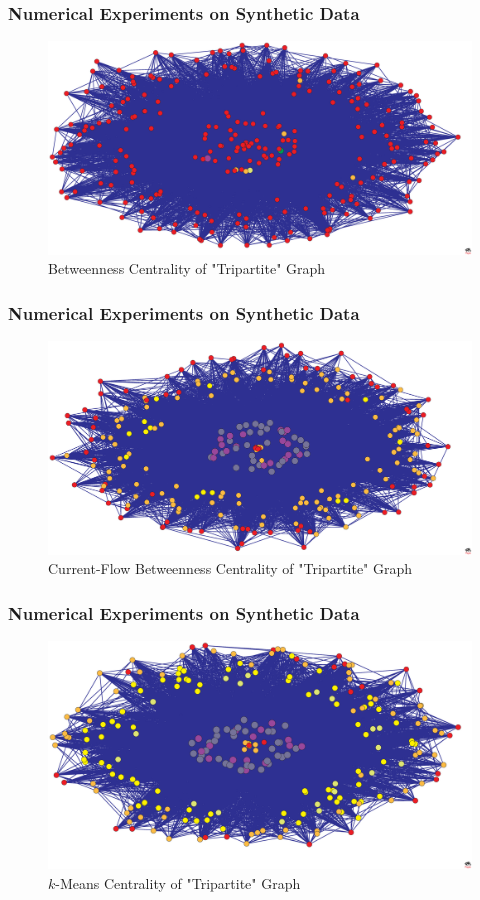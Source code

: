 \documentclass{beamer}
\begin{document}
\begin{frame}
\frametitle{Numerical Experiments on Synthetic Data}
\begin{figure}[h]
\begin{center}
\includegraphics[width=0.76\columnwidth]{toy2_betweenness2}
\end{center}
\caption{Betweenness Centrality of "Tripartite" Graph}
\label{fig:Betweenness Centrality - Toy2}
\end{figure}
\end{frame}

\begin{frame}
\frametitle{Numerical Experiments on Synthetic Data}
\begin{figure}[h]
\begin{center}
\includegraphics[width=0.76\columnwidth]{toy2_current_flow_betweenness}
\end{center}
\caption{Current-Flow Betweenness Centrality of "Tripartite" Graph}
\label{fig:Current Flow Betweenness Centrality - Toy2}
\end{figure}
\end{frame}

\begin{frame}
\frametitle{Numerical Experiments on Synthetic Data}
\begin{figure}[h]
\begin{center}
\includegraphics[width=0.76\columnwidth]{toy2_k_centrality}
\end{center}
\caption{$k$-Means Centrality of "Tripartite" Graph}
\label{fig:K-Centrality - Toy2}
\end{figure}
\end{frame}
\end{document}
